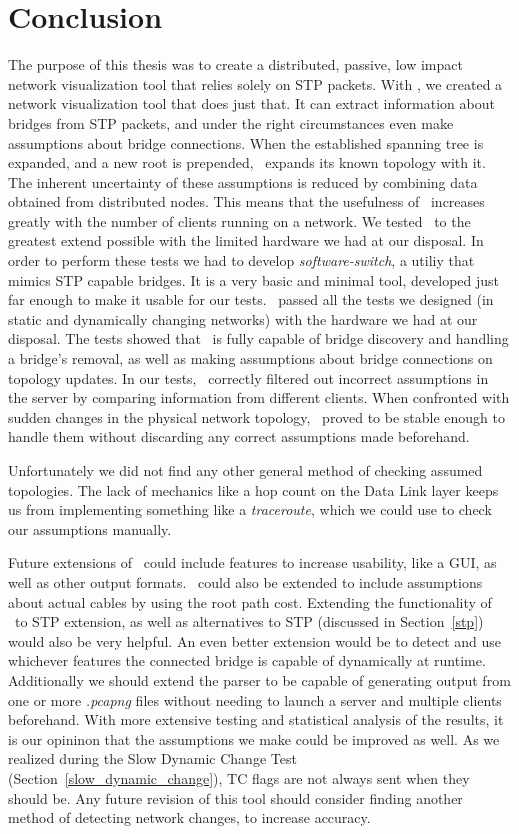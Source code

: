 \chapter{Conclusion}
\label{conclusion}
The purpose of this thesis was to create a distributed, passive, low impact network visualization tool that relies solely on STP packets.
With \tool, we created a network visualization tool that does just that.
It can extract information about bridges from STP packets, and under the right circumstances even make assumptions about bridge connections.
When the established spanning tree is expanded, and a new root is prepended, \tool\ expands its known topology with it.
The inherent uncertainty of these assumptions is reduced by combining data obtained from distributed nodes.
This means that the usefulness of \tool\ increases greatly with the number of clients running on a network.
We tested \tool\ to the greatest extend possible with the limited hardware we had at our disposal.
In order to perform these tests we had to develop \textit{software-switch}, a utiliy that mimics STP capable bridges.
It is a very basic and minimal tool, developed just far enough to make it usable for our tests.
\tool\ passed all the tests we designed (in static and dynamically changing networks) with the hardware we had at our disposal.
The tests showed that \tool\ is fully capable of bridge discovery and handling a bridge's removal, as well as making assumptions about bridge connections on topology updates.
In our tests, \tool\ correctly filtered out incorrect assumptions in the server by comparing information from different clients.
When confronted with sudden changes in the physical network topology, \tool\ proved to be stable enough to handle them without discarding any correct assumptions made beforehand.

Unfortunately we did not find any other general method of checking assumed topologies.
The lack of mechanics like a hop count on the Data Link layer keeps us from implementing something like a \textit{traceroute}, which we could use to check our assumptions manually.

Future extensions of \tool\ could include features to increase usability, like a GUI, as well as other output formats.
\tool\ could also be extended to include assumptions about actual cables by using the root path cost.
Extending the functionality of \tool\ to STP extension, as well as alternatives to STP (discussed in Section~\ref{stp}) would also be very helpful.
An even better extension would be to detect and use whichever features the connected bridge is capable of dynamically at runtime.
Additionally we should extend the parser to be capable of generating output from one or more \textit{.pcapng} files without needing to launch a server and multiple clients beforehand.
With more extensive testing and statistical analysis of the results, it is our opininon that the assumptions we make could be improved as well.
As we realized during the Slow Dynamic Change Test (Section~\ref{slow_dynamic_change}), TC flags are not always sent when they should be.
Any future revision of this tool should consider finding another method of detecting network changes, to increase accuracy.

